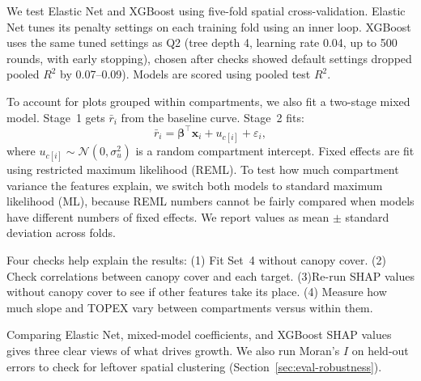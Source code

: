 \documentclass[logo,msc,ai]{infthesis}           %
\begin{document}
We test Elastic Net and XGBoost using five-fold spatial cross-validation. Elastic Net tunes its penalty settings on each training fold using an inner loop. XGBoost uses the same tuned settings as Q2 (tree depth 4, learning rate 0.04, up to 500 rounds, with early stopping), chosen after checks showed default settings dropped pooled $R^2$ by 0.07--0.09). Models are scored using pooled test $R^2$.

To account for plots grouped within compartments, we also fit a two-stage mixed model. Stage~1 gets $\bar r_i$ from the baseline curve. Stage~2 fits:
\begin{equation}
\bar r_i=\boldsymbol{\beta}^{\top}\mathbf{x}_i+u_{c[i]}+\varepsilon_i,
\label{eq:mixed-effects}
\end{equation}
where $u_{c[i]}\sim\mathcal{N}(0,\sigma_u^2)$ is a random compartment intercept. Fixed effects are fit using restricted maximum likelihood (REML). To test how much compartment variance the features explain, we switch both models to standard maximum likelihood (ML), because REML numbers cannot be fairly compared when models have different numbers of fixed effects. We report values as mean $\pm$ standard deviation across folds.

Four checks help explain the results: (1) Fit Set~4 without canopy cover. (2) Check correlations between canopy cover and each target. (3)Re-run SHAP values without canopy cover to see if other features take its place. (4) Measure how much slope and TOPEX vary between compartments versus within them.

Comparing Elastic Net, mixed-model coefficients, and XGBoost SHAP values gives three clear views of what drives growth. We also run Moran's $I$ on held-out errors to check for leftover spatial clustering (Section~\ref{sec:eval-robustness}).

\end{document}
